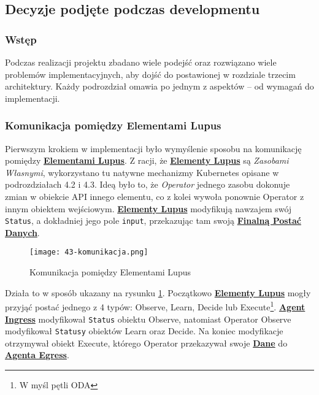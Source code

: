 \subsection{Decyzje podjęte podczas developmentu}

\subsubsection{Wstęp}

Podczas realizacji projektu zbadano wiele podejść oraz rozwiązano wiele problemów implementacyjnych, aby dojść do postawionej w rozdziale trzecim architektury. Każdy podrozdział omawia po jednym z aspektów – od wymagań do implementacji.

\subsubsection{Komunikacja pomiędzy Elementami Lupus}

Pierwszym krokiem w implementacji było wymyślenie sposobu na komunikację pomiędzy \hyperlink{def:element-lupus}{\textbf{Elementami Lupus}}. Z racji, że \hyperlink{def:element-lupus}{\textbf{Elementy Lupus}} są \textit{Zasobami Własnymi}, wykorzystano tu natywne mechanizmy Kubernetes opisane w podrozdziałach 4.2 i 4.3. Ideą było to, że \textit{Operator} jednego zasobu dokonuje zmian w obiekcie API innego elementu, co z kolei wywoła ponownie Operator z innym obiektem wejściowym. \hyperlink{def:element-lupus}{\textbf{Elementy Lupus}} modyfikują nawzajem swój \texttt{Status}, a dokładniej jego pole \texttt{input}, przekazując tam swoją \hyperlink{def:finalne-dane}{\textbf{Finalną Postać Danych}}.

\begin{figure}[!h]
    \centering \texttt{[image: 43-komunikacja.png]}
    \caption{Komunikacja pomiędzy Elementami Lupus}\label{fig:43-komunikacja}
\end{figure}

Działa to w sposób ukazany na rysunku \ref{fig:43-komunikacja}. Początkowo \hyperlink{def:element-lupus}{\textbf{Elementy Lupus}} mogły przyjąć postać jednego z 4 typów: Observe, Learn, Decide lub Execute\footnote{W myśl pętli ODA}. \hyperlink{def:agent-ingress}{\textbf{Agent Ingress}} modyfikował \texttt{Status} obiektu Observe, natomiast Operator Observe modyfikował \texttt{Statusy} obiektów Learn oraz Decide. Na koniec modyfikacje otrzymywał obiekt Execute, którego Operator przekazywał swoje \hyperlink{def:dane}{\textbf{Dane}} do \hyperlink{def:agent-egress}{\textbf{Agenta Egress}}. 

